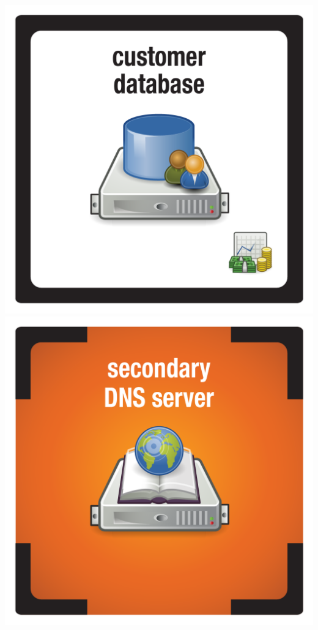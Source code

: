 \documentclass{letter}
\begin{document}
\includegraphics{tiles/node_customer_db}
\includegraphics{tiles/node_secondary_dns_compromised} \\
\end{document}
